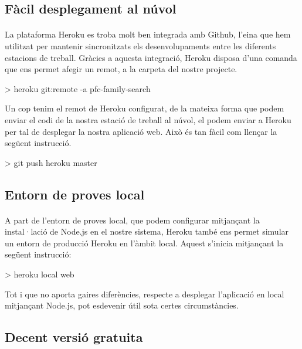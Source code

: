     \subsection{Fàcil desplegament al núvol}

    \paragraph{}
    La plataforma Heroku es troba molt ben integrada amb Github, l'eina que hem utilitzat per mantenir sincronitzats els desenvolupaments entre les diferents estacions de treball. Gràcies a aquesta integració, Heroku disposa d'una comanda que ens permet afegir un remot, a la carpeta del nostre projecte.

    \begin{displayquote}
        > heroku git:remote -a pfc-family-search
    \end{displayquote}

    Un cop tenim el remot de Heroku configurat, de la mateixa forma que podem enviar el codi de la nostra estació de treball al núvol, el podem enviar a Heroku per tal de desplegar la nostra aplicació web. Això és tan fàcil com llençar la següent instrucció.

    \begin{displayquote}
        > git push heroku master
    \end{displayquote}


    \subsection{Entorn de proves local}

    \paragraph{}
    A part de l'entorn de proves local, que podem configurar mitjançant la instal·lació de Node.js en el nostre sistema, Heroku també ens permet simular un entorn de producció Heroku en l'àmbit local. Aquest s'inicia mitjançant la següent instrucció:

    \begin{displayquote}
        > heroku local web
    \end{displayquote}

    Tot i que no aporta gaires diferències, respecte a desplegar l'aplicació en local mitjançant Node.js, pot esdevenir útil sota certes circumstàncies.


    \subsection{Decent versió gratuita}

